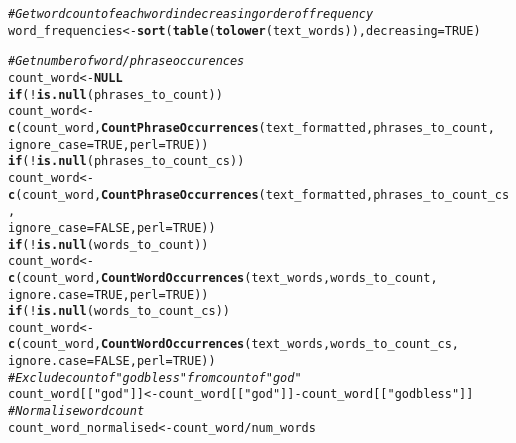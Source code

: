 \documentclass{article}\usepackage[]{graphicx}\usepackage[]{color}
\makeatletter
\newcommand{\hlnum}[1]{\textcolor[rgb]{0.686,0.059,0.569}{#1}}%
\newcommand{\hlstr}[1]{\textcolor[rgb]{0.192,0.494,0.8}{#1}}%
\newcommand{\hlcom}[1]{\textcolor[rgb]{0.678,0.584,0.686}{\textit{#1}}}%
\newcommand{\hlopt}[1]{\textcolor[rgb]{0,0,0}{#1}}%
\newcommand{\hlstd}[1]{\textcolor[rgb]{0.345,0.345,0.345}{#1}}%
\newcommand{\hlkwa}[1]{\textcolor[rgb]{0.161,0.373,0.58}{\textbf{#1}}}%
\newcommand{\hlkwb}[1]{\textcolor[rgb]{0.69,0.353,0.396}{#1}}%
\newcommand{\hlkwc}[1]{\textcolor[rgb]{0.333,0.667,0.333}{#1}}%
\newcommand{\hlkwd}[1]{\textcolor[rgb]{0.737,0.353,0.396}{\textbf{#1}}}%
\newenvironment{kframe}{%
 \def\at@end@of@kframe{}%
 \ifinner\ifhmode%
  \def\at@end@of@kframe{\end{minipage}}%
  \begin{minipage}{\columnwidth}%
 \fi\fi%
 \def\FrameCommand##1{\hskip\@totalleftmargin \hskip-\fboxsep
 \colorbox{shadecolor}{##1}\hskip-\fboxsep
     \hskip-\linewidth \hskip-\@totalleftmargin \hskip\columnwidth}%
 \MakeFramed {\advance\hsize-\width
   \@totalleftmargin\z@ \linewidth\hsize
   \@setminipage}}%
 {\par\unskip\endMakeFramed%
 \at@end@of@kframe}
\newenvironment{knitrout}{}{} %
\makeatother
\begin{document}
\begin{knitrout}
\begin{kframe}
\begin{alltt}
  \hlcom{# Get word count of each word in decreasing order of frequency}
  \hlstd{word_frequencies} \hlkwb{<-} \hlkwd{sort}\hlstd{(}\hlkwd{table}\hlstd{(}\hlkwd{tolower}\hlstd{(text_words)),} \hlkwc{decreasing} \hlstd{=} \hlnum{TRUE}\hlstd{)}

  \hlcom{# Get number of word/phrase occurences}
  \hlstd{count_word} \hlkwb{<-} \hlkwa{NULL}
  \hlkwa{if} \hlstd{(}\hlopt{!}\hlkwd{is.null}\hlstd{(phrases_to_count))}
    \hlstd{count_word} \hlkwb{<-} \hlkwd{c}\hlstd{(count_word,} \hlkwd{CountPhraseOccurrences}\hlstd{(text_formatted, phrases_to_count,}
                                                       \hlkwc{ignore_case} \hlstd{=} \hlnum{TRUE}\hlstd{,} \hlkwc{perl} \hlstd{=} \hlnum{TRUE}\hlstd{))}
  \hlkwa{if} \hlstd{(}\hlopt{!}\hlkwd{is.null}\hlstd{(phrases_to_count_cs))}
    \hlstd{count_word} \hlkwb{<-} \hlkwd{c}\hlstd{(count_word,} \hlkwd{CountPhraseOccurrences}\hlstd{(text_formatted, phrases_to_count_cs,}
                                                       \hlkwc{ignore_case} \hlstd{=} \hlnum{FALSE}\hlstd{,} \hlkwc{perl} \hlstd{=} \hlnum{TRUE}\hlstd{))}
  \hlkwa{if} \hlstd{(}\hlopt{!}\hlkwd{is.null}\hlstd{(words_to_count))}
    \hlstd{count_word} \hlkwb{<-} \hlkwd{c}\hlstd{(count_word,} \hlkwd{CountWordOccurrences}\hlstd{(text_words, words_to_count,}
                                                     \hlkwc{ignore.case} \hlstd{=} \hlnum{TRUE}\hlstd{,} \hlkwc{perl} \hlstd{=} \hlnum{TRUE}\hlstd{))}
  \hlkwa{if} \hlstd{(}\hlopt{!}\hlkwd{is.null}\hlstd{(words_to_count_cs))}
    \hlstd{count_word} \hlkwb{<-} \hlkwd{c}\hlstd{(count_word,} \hlkwd{CountWordOccurrences}\hlstd{(text_words, words_to_count_cs,}
                                                     \hlkwc{ignore.case} \hlstd{=} \hlnum{FALSE}\hlstd{,} \hlkwc{perl} \hlstd{=} \hlnum{TRUE}\hlstd{))}
  \hlcom{# Exclude count of "god bless" from count of "god"}
  \hlstd{count_word[[}\hlstr{"god"}\hlstd{]]} \hlkwb{<-} \hlstd{count_word[[}\hlstr{"god"}\hlstd{]]} \hlopt{-} \hlstd{count_word[[}\hlstr{"god bless"}\hlstd{]]}
  \hlcom{# Normalise word count}
  \hlstd{count_word_normalised} \hlkwb{<-} \hlstd{count_word}\hlopt{/}\hlstd{num_words}


\end{alltt}
\end{kframe}
\end{knitrout}
\end{document}
